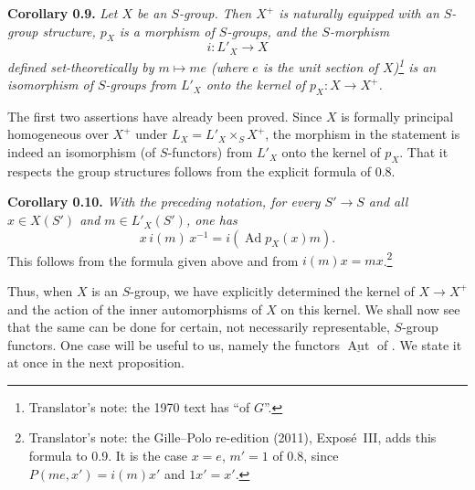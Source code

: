 \medskip
\noindent{}\textbf{Corollary 0.9.}
\textit{Let \(X\) be an \(S\)-group. Then \(X^+\) is naturally equipped with an
\(S\)-group structure, \(p_X\) is a morphism of \(S\)-groups, and the
\(S\)-morphism}
\[
 i:L'_X\longrightarrow X
\]
\textit{defined set-theoretically by \(m\mapsto me\) \textup{(}where \(e\) is
the unit section of \(X\)\textup{)}\footnote{Translator's note: the 1970 text
has ``of \(G\)''.} is an isomorphism of \(S\)-groups from \(L'_X\) onto the
kernel of \(p_X:X\to X^+\).}

The first two assertions have already been proved. Since \(X\) is
formally principal homogeneous over \(X^+\) under
\(L_X=L'_X\times_S X^+\), the morphism in the statement is indeed an
isomorphism (of \(S\)-functors) from \(L'_X\) onto the kernel of \(p_X\). That
it respects the group structures follows from the explicit formula of 0.8.

\medskip
\noindent{}\textbf{Corollary 0.10.}
\textit{With the preceding notation, for every \(S'\to S\) and all
\(x\in X(S')\) and \(m\in L'_X(S')\), one has}
\[
 x\,i(m)\,x^{-1}=i(\operatorname{Ad}p_X(x)m).
\]
This follows from the formula given above and from
\(i(m)x=mx\).\footnote{Translator's note: the Gille--Polo re-edition (2011), Exposé~III, adds this formula to 0.9. It is the case
\(x=e\), \(m'=1\) of 0.8, since \(P(me,x')=i(m)x'\) and \(1x'=x'\).}

Thus, when \(X\) is an \(S\)-group, we have explicitly determined the
kernel of \(X\to X^+\) and the action of the inner automorphisms of
\(X\) on this kernel. We shall now see that the same can be done for
certain, not necessarily representable, \(S\)-group functors. One case
will be useful to us, namely the functors
\(\underline{\operatorname{Aut}}\) of . We state it at
once in the next proposition.


